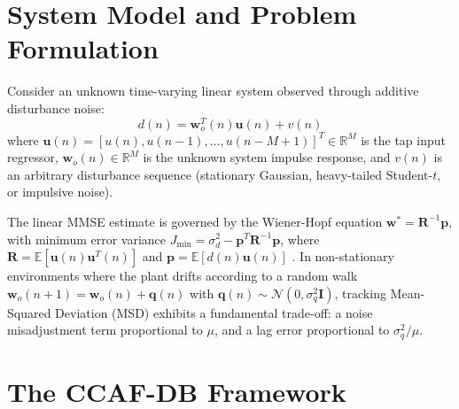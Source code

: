 \documentclass[journal,twocolumn]{IEEEtran}
\begin{document}
\section{System Model and Problem Formulation}
Consider an unknown time-varying linear system observed through additive disturbance noise:
\begin{equation}
    d(n) = \mathbf{w}_o^T(n) \mathbf{u}(n) + v(n)
\end{equation}
where $\mathbf{u}(n) = [u(n), u(n-1), \dots, u(n-M+1)]^T \in \mathbb{R}^M$ is the tap input regressor, $\mathbf{w}_o(n) \in \mathbb{R}^M$ is the unknown system impulse response, and $v(n)$ is an arbitrary disturbance sequence (stationary Gaussian, heavy-tailed Student-$t$, or impulsive noise).

The linear MMSE estimate is governed by the Wiener-Hopf equation $\mathbf{w}^* = \mathbf{R}^{-1} \mathbf{p}$, with minimum error variance $J_{\min} = \sigma_d^2 - \mathbf{p}^T \mathbf{R}^{-1} \mathbf{p}$, where $\mathbf{R} = \mathbb{E}[\mathbf{u}(n)\mathbf{u}^T(n)]$ and $\mathbf{p} = \mathbb{E}[d(n)\mathbf{u}(n)]$ \cite{sayed2008adaptive}. In non-stationary environments where the plant drifts according to a random walk $\mathbf{w}_o(n+1) = \mathbf{w}_o(n) + \mathbf{q}(n)$ with $\mathbf{q}(n) \sim \mathcal{N}(0, \sigma_q^2 \mathbf{I})$, tracking Mean-Squared Deviation (MSD) exhibits a fundamental trade-off: a noise misadjustment term proportional to $\mu$, and a lag error proportional to $\sigma_q^2 / \mu$.

\section{The CCAF-DB Framework}
\end{document}
